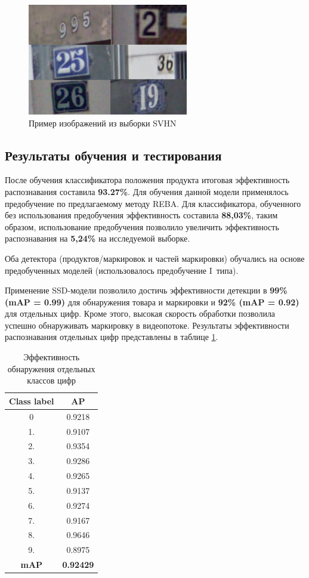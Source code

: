 \begin{figure}[ht]
	\centering
	\includegraphics[width=7cm]{man-source/images/ch4/pic4-14.png}
	\caption{Пример изображений из выборки SVHN}
	\label{fig:svhn_dataset}
\end{figure}

\subsection{Результаты обучения и тестирования} 
После обучения классификатора положения продукта итоговая эффективность распознавания составила \textbf{93.27\%}. Для обучения данной модели применялось предобучение по предлагаемому методу REBA.
Для классификатора, обученного без использования предобучения эффективность составила \textbf{88,03\%}, таким образом, использование предобучения позволило увеличить эффективность распознавания на \textbf{5,24\%} на исследуемой выборке.

Оба детектора (продуктов/маркировок и частей маркировки) обучались на основе предобученных моделей (использовалось предобучение I~типа).

Применение SSD-модели позволило достичь эффективности детекции в \textbf{99\% (mAP = 0.99)} для обнаружения товара и маркировки и \textbf{92\% (mAP = 0.92)} для отдельных цифр. Кроме этого, высокая скорость обработки позволила успешно обнаруживать маркировку в видеопотоке. Результаты эффективности распознавания отдельных цифр представлены в таблице \ref{tab:efficiency_detector1}.  

\begin{table}[h]
\caption{Эффективность обнаружения отдельных классов цифр}
\centering
\begin{tabular}{ | c | c |  }
\hline
Class label & AP \\ \hline
0 & 0.9218\\
1. & 0.9107\\
2. & 0.9354\\
3. & 0.9286\\
4. & 0.9265\\
5. & 0.9137\\
6. & 0.9274\\
7. & 0.9167\\
8. & 0.9646\\
9. & 0.8975\\
\hline
\textbf{mAP} & \textbf{0.92429}\\
\hline
\end{tabular}
\label{tab:efficiency_detector1}
\end{table}

